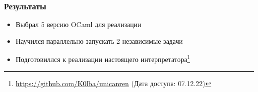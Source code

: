 \documentclass{beamer}
\begin{document}




\begin{frame}
  \frametitle{Результаты}
  \begin{itemize}
  \item Выбрал 5 версию OCaml для реализации
  \item Научился параллельно запускать 2 независимые задачи
  \item Подготовиллся к реализации настоящего интерпретатора\footnote{\url{https://github.com/K0lba/unicanren} (Дата доступа: 07.12.22)}
  \end{itemize}
  
  
  \end{frame}
  


\appendix
\end{document}

